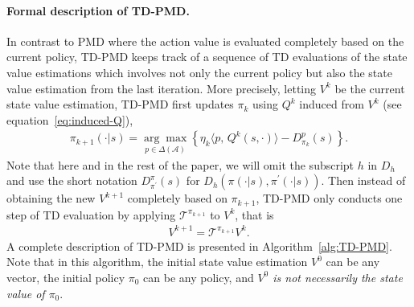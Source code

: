 \documentclass[10pt]{article}
\newcommand{\calA}{\mathcal{A}}
\newcommand{\calT}{\mathcal{T}}
\newcommand{\ls}{\left}
\newcommand{\rs}{\right}
\theoremstyle{plain}
\theoremstyle{definition}
\begin{document}
\paragraph{Formal description of TD-PMD.} In contrast to PMD where the action value is evaluated completely based on the current policy,  TD-PMD keeps track of a sequence of TD evaluations of  the state value estimations which involves not only the current policy but also the state value estimation from the last iteration. More precisely, letting  $V^k$ be the current state value estimation, TD-PMD first updates $\pi_k$ using $Q^k$ induced from $V^k$ (see equation~\eqref{eq:induced-Q}),
\begin{align}
    \pi_{k+1}(\cdot|s) \!=\! \underset{p\in\Delta(\calA)}{\arg\max} \ls\{ \eta_k \langle p, \, Q^{k}(s,\cdot) \rangle \!-\! D^p_{\pi_k}(s)\rs\}.
    \label{eq:TD-PMD-policy-step}
\end{align}
{Note that here and in the rest of the paper, we will omit the subscript $h$  in $D_h$ and use the short notation $D^{\pi}_{\pi^\prime}(s)$ for $D_h(\pi(\cdot|s), \pi^\prime(\cdot|s))$.} Then instead of obtaining the new $V^{k+1}$ completely based on $\pi_{k+1}$,  TD-PMD only conducts one step of TD evaluation by applying $\mathcal{T}^{\pi_{k+1}}$ to $V^k$, that is
\begin{align}
    V^{k+1} = \calT^{\pi_{k+1}} V^k.
    \label{eq:TD-PMD-value-step}
\end{align}
A complete description of TD-PMD is presented in Algorithm~\ref{alg:TD-PMD}. Note that in this algorithm, the initial state value estimation $V^0$ can be any vector,  the initial policy $\pi_0$ can be any policy, and {\em $V^0$ is not necessarily the state value of $\pi_0$}.%
\end{document}
